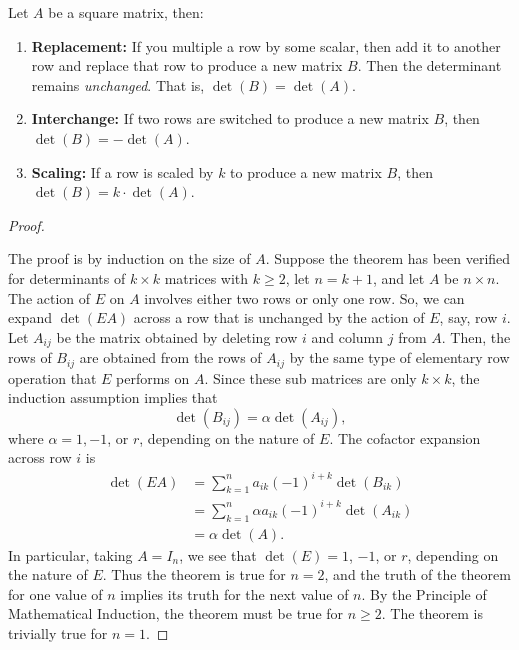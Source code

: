\begin{theorem}
  \label{thm:row_operations}

  Let $A$ be a square matrix, then:
  \begin{enumerate}
    \label{enum:row_operations}

    \item \textbf{Replacement:} If you multiple a row by some scalar, then add
      it to another row and replace that row to produce a new matrix $B$. Then
      the determinant remains \textit{unchanged}. That is, $\det(B) = \det(A)$.

    \item \textbf{Interchange:} If two rows are switched to produce a new matrix
      $B$, then $\det(B) = -\det(A)$.

    \item \textbf{Scaling:} If a row is scaled by $k$ to produce a new matrix
      $B$, then $\det(B) = k \cdot \det(A)$.
  \end{enumerate}
\end{theorem}

\begin{proof}
  \label{prf:row_operations}

  The proof is by induction on the size of $A$. Suppose the theorem has been
  verified for determinants of $k \times k$ matrices with $k \ge 2$, let $n = k
  + 1$, and let $A$ be $n \times n$. The action of $E$ on $A$ involves either
  two rows or only one row. So, we can expand $\det(EA)$ across a row that is
  unchanged by the action of $E$, say, row $i$. Let $A_{ij}$ be the matrix
  obtained by deleting row $i$ and column $j$ from $A$. Then, the rows of
  $B_{ij}$ are obtained from the rows of $A_{ij}$ by the same type of elementary
  row operation that $E$ performs on $A$. Since these sub matrices are only $k
  \times k$, the induction assumption implies that
  \[%
    \det(B_{ij}) = \alpha\det(A_{ij})
  ,\]%
  where $\alpha = 1, -1$, or $r$, depending on the nature of $E$. The cofactor
  expansion across row $i$ is
  \begin{align*}
    \det(EA) &= \sum_{k=1}^{n} a_{ik}(-1)^{i+k} \det(B_{ik}) \\
             &= \sum_{k=1}^{n} \alpha a_{ik}(-1)^{i+k} \det(A_{ik}) \\
             &= \alpha \det(A)
  .\end{align*}
  In particular, taking $A = I_n$, we see that $\det(E) = 1$, $-1$, or $r$,
  depending on the nature of $E$. Thus the theorem is true for $n = 2$, and the
  truth of the theorem for one value of $n$ implies its truth for the next value
  of $n$. By the Principle of Mathematical Induction, the theorem must be true
  for $n \ge 2$. The theorem is trivially true for $n = 1$.
\end{proof}

